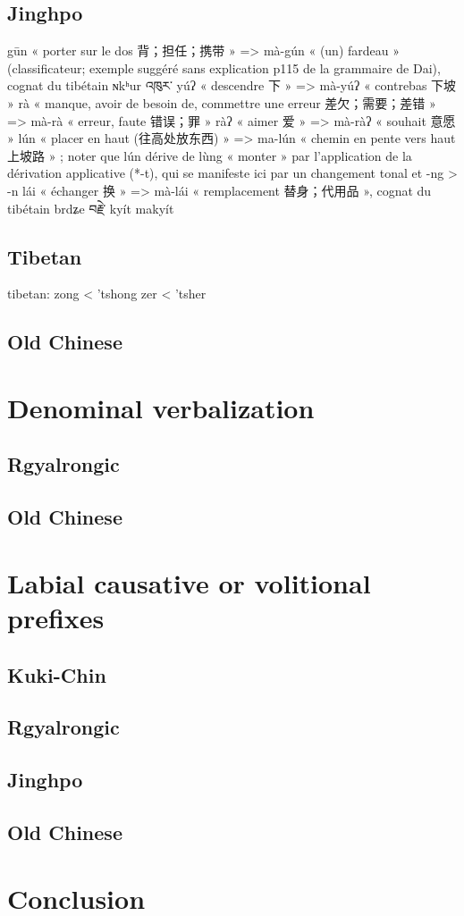\documentclass[oneside,a4paper,11pt]{article}
\begin{document}
\subsection{Jinghpo}

 \citet[4]{dai92yufa}
gūn « porter sur le dos 背；担任；携带 » => mà-gún « (un) fardeau » (classificateur; exemple suggéré sans explication p115 de la grammaire de Dai), cognat du tibétain ɴkʰur འཁུར་
yúʔ « descendre 下 » => mà-yúʔ « contrebas 下坡 »
rà « manque, avoir de besoin de, commettre une erreur 差欠；需要；差错 » => mà-rà « erreur, faute 错误；罪 »
ràʔ « aimer 爱 » => mà-ràʔ « souhait 意愿 »
lún « placer en haut (往高处放东西) » => ma-lún « chemin en pente vers haut 上坡路 » ; noter que lún dérive de lùng « monter » par l’application de la dérivation applicative (*-t), qui se manifeste ici par un changement tonal et -ng > -n
lái « échanger 换 » => mà-lái « remplacement 替身；代用品 », cognat du tibétain brdʑe བརྗེ་
kyít makyít

\subsection{Tibetan}
tibetan:
zong < 'tshong
zer < 'tsher
\subsection{Old Chinese}
\section{Denominal verbalization}
\subsection{Rgyalrongic}
\subsection{Old Chinese}
\section{Labial causative or volitional prefixes}
\subsection{Kuki-Chin}
\subsection{Rgyalrongic}
\subsection{Jinghpo}
\subsection{Old Chinese}
\section*{Conclusion}



\end{document}
